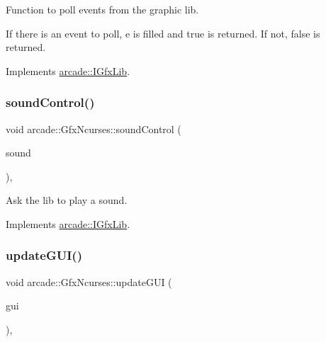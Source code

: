 Function to poll events from the graphic lib. 

If there is an event to poll, e is filled and true is returned. If not, false is returned. 

Implements \hyperlink{classarcade_1_1_i_gfx_lib_a82cdd82f168ca898ef81edf82ca6147a}{arcade\+::\+I\+Gfx\+Lib}.

\mbox{\label{classarcade_1_1_gfx_ncurses_a5eabfc85f5ae13bf0592dd21add9f301}} 
\subsubsection{\texorpdfstring{sound\+Control()}{soundControl()}}
{\footnotesize\ttfamily void arcade\+::\+Gfx\+Ncurses\+::sound\+Control (\begin{DoxyParamCaption}\item[{const \hyperlink{structarcade_1_1_sound}{Sound} \&}]{sound }\end{DoxyParamCaption})\hspace{0.3cm}{\ttfamily [override]}, {\ttfamily [virtual]}}



Ask the lib to play a sound. 



Implements \hyperlink{classarcade_1_1_i_gfx_lib_a0b965ed555739ef366b27583799d794c}{arcade\+::\+I\+Gfx\+Lib}.

\mbox{\label{classarcade_1_1_gfx_ncurses_a00469b26c23ff57efdbb2f99dedbbb11}} 
\subsubsection{\texorpdfstring{update\+G\+U\+I()}{updateGUI()}}
{\footnotesize\ttfamily void arcade\+::\+Gfx\+Ncurses\+::update\+G\+UI (\begin{DoxyParamCaption}\item[{\hyperlink{classarcade_1_1_i_g_u_i}{I\+G\+UI} \&}]{gui }\end{DoxyParamCaption})\hspace{0.3cm}{\ttfamily [override]}, {\ttfamily [virtual]}}




